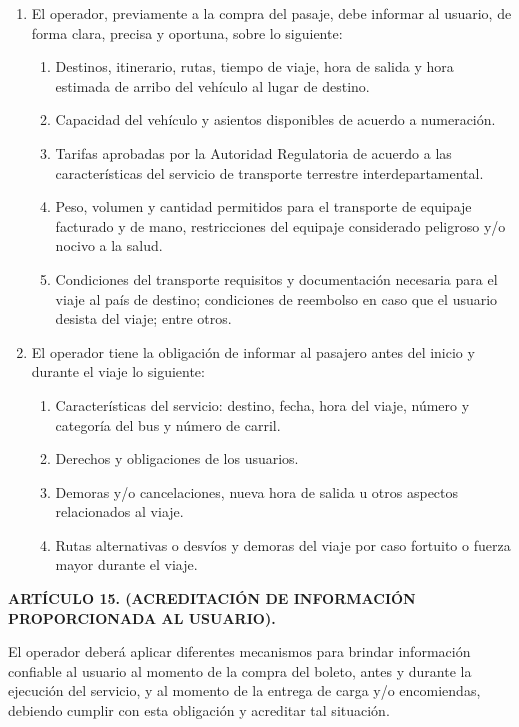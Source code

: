 	\begin{enumerate}[label=\Roman*., nosep] %
		\item El operador, previamente a la compra del pasaje, debe informar al usuario, de forma clara, precisa y oportuna, sobre lo siguiente:
		\begin{enumerate}[label=\alph*), nosep] %
			\item Destinos, itinerario, rutas, tiempo de viaje, hora de salida y hora estimada de arribo del vehículo al lugar de destino.
			\item Capacidad del vehículo y asientos disponibles de acuerdo a numeración.
			\item Tarifas aprobadas por la Autoridad Regulatoria de acuerdo a las características del servicio de transporte terrestre interdepartamental.
			\item Peso, volumen y cantidad permitidos para el transporte de equipaje facturado y de mano, restricciones del equipaje considerado peligroso y/o nocivo a la salud.
			\item Condiciones del transporte requisitos y documentación necesaria para el viaje al país de destino; condiciones de reembolso en caso que el usuario desista del viaje; entre otros.
		\end{enumerate}
		
		\item El operador tiene la obligación de informar al pasajero antes del inicio y durante el viaje lo siguiente:
		\begin{enumerate}[label=\alph*), nosep]
			\item Características del servicio: destino, fecha, hora del viaje, número y categoría del bus y número de carril.
			\item Derechos y obligaciones de los usuarios.
			\item  Demoras y/o cancelaciones, nueva hora de salida u otros aspectos relacionados al viaje.
			\item Rutas alternativas o desvíos y demoras del viaje por caso fortuito o fuerza mayor durante el viaje.
		\end{enumerate}
	\end{enumerate}
	
	\textbf{ARTÍCULO 15. (ACREDITACIÓN DE INFORMACIÓN PROPORCIONADA AL USUARIO).}
	
	El operador deberá aplicar diferentes mecanismos para brindar información confiable al usuario al momento de la compra del boleto, antes y durante la ejecución del servicio, y al momento de la entrega de carga y/o encomiendas, debiendo cumplir con esta obligación y acreditar tal situación.
	
